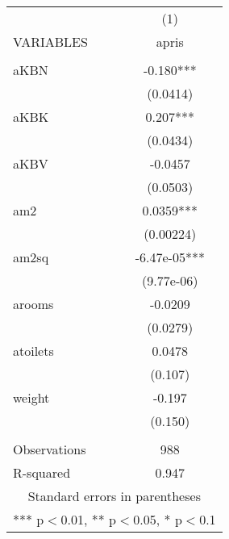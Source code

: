 \documentclass[]{article}
\begin{document}
\begin{tabular}{lc} \hline
 & (1) \\
VARIABLES & apris \\ \hline
 &  \\
aKBN & -0.180*** \\
 & (0.0414) \\
aKBK & 0.207*** \\
 & (0.0434) \\
aKBV & -0.0457 \\
 & (0.0503) \\
am2 & 0.0359*** \\
 & (0.00224) \\
am2sq & -6.47e-05*** \\
 & (9.77e-06) \\
arooms & -0.0209 \\
 & (0.0279) \\
atoilets & 0.0478 \\
 & (0.107) \\
weight & -0.197 \\
 & (0.150) \\
 &  \\
Observations & 988 \\
 R-squared & 0.947 \\ \hline
\multicolumn{2}{c}{ Standard errors in parentheses} \\
\multicolumn{2}{c}{ *** p$<$0.01, ** p$<$0.05, * p$<$0.1} \\
\end{tabular}
\end{document}
